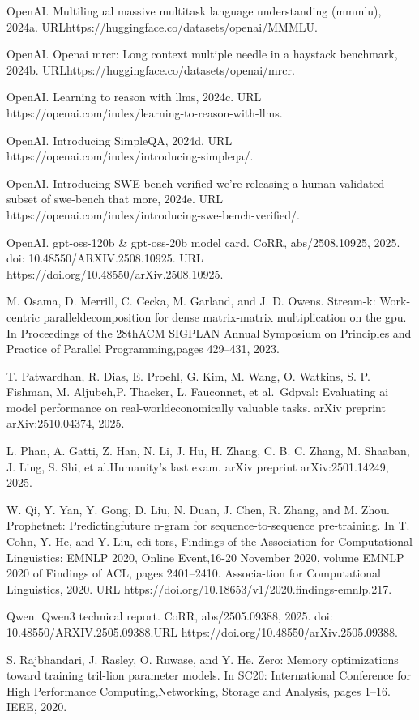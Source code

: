 \documentclass[
  10
]{article}
\begin{document}
OpenAI. Multilingual massive multitask language understanding (mmmlu),
2024a. URLhttps://huggingface.co/datasets/openai/MMMLU.

OpenAI. Openai mrcr: Long context multiple needle in a haystack
benchmark, 2024b. URLhttps://huggingface.co/datasets/openai/mrcr.

OpenAI. Learning to reason with llms, 2024c. URL
https://openai.com/index/learning-to-reason-with-llms.

OpenAI. Introducing SimpleQA, 2024d. URL
https://openai.com/index/introducing-simpleqa/.

OpenAI. Introducing SWE-bench verified we're releasing a human-validated
subset of swe-bench that more, 2024e. URL
https://openai.com/index/introducing-swe-bench-verified/.

OpenAI. gpt-oss-120b \& gpt-oss-20b model card. CoRR, abs/2508.10925,
2025. doi: 10.48550/ARXIV.2508.10925. URL
https://doi.org/10.48550/arXiv.2508.10925.

M. Osama, D. Merrill, C. Cecka, M. Garland, and J. D. Owens. Stream-k:
Work-centric paralleldecomposition for dense matrix-matrix
multiplication on the gpu. In Proceedings of the 28thACM SIGPLAN Annual
Symposium on Principles and Practice of Parallel Programming,pages
429--431, 2023.

T. Patwardhan, R. Dias, E. Proehl, G. Kim, M. Wang, O. Watkins, S. P.
Fishman, M. Aljubeh,P. Thacker, L. Fauconnet, et al.~Gdpval: Evaluating
ai model performance on real-worldeconomically valuable tasks. arXiv
preprint arXiv:2510.04374, 2025.

L. Phan, A. Gatti, Z. Han, N. Li, J. Hu, H. Zhang, C. B. C. Zhang, M.
Shaaban, J. Ling, S. Shi, et al.Humanity's last exam. arXiv preprint
arXiv:2501.14249, 2025.

W. Qi, Y. Yan, Y. Gong, D. Liu, N. Duan, J. Chen, R. Zhang, and M. Zhou.
Prophetnet: Predictingfuture n-gram for sequence-to-sequence
pre-training. In T. Cohn, Y. He, and Y. Liu, edi-tors, Findings of the
Association for Computational Linguistics: EMNLP 2020, Online
Event,16-20 November 2020, volume EMNLP 2020 of Findings of ACL, pages
2401--2410. Associa-tion for Computational Linguistics, 2020. URL
https://doi.org/10.18653/v1/2020.findings-emnlp.217.

Qwen. Qwen3 technical report. CoRR, abs/2505.09388, 2025. doi:
10.48550/ARXIV.2505.09388.URL https://doi.org/10.48550/arXiv.2505.09388.

S. Rajbhandari, J. Rasley, O. Ruwase, and Y. He. Zero: Memory
optimizations toward training tril-lion parameter models. In SC20:
International Conference for High Performance Computing,Networking,
Storage and Analysis, pages 1--16. IEEE, 2020.
\end{document}
